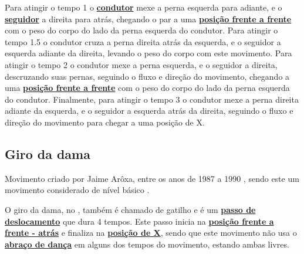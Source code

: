 Para atingir o tempo 1 o \hyperref[def:Condutor]{\textbf{condutor}} mexe a perna esquerda para adiante, 
e o \hyperref[def:Seguidor]{\textbf{seguidor}}  a direita para atrás,
chegando o par a uma \hyperref[def:frente-frente-position]{\textbf{posição frente a frente}}
com o peso do corpo do lado da perna esquerda do condutor.
Para atingir o tempo 1.5 o condutor cruza a perna direita atrás da esquerda,
e o seguidor a esquerda adiante da direita, levando o peso do corpo com este movimento.
Para atingir o tempo 2 o condutor mexe a perna esquerda, e o seguidor a direita,
descruzando suas pernas, seguindo o fluxo e direção do movimento,
chegando a uma \hyperref[def:frente-frente-position]{\textbf{posição frente a frente}}
com o peso do corpo do lado da perna esquerda do condutor.
Finalmente, para atingir o tempo 3 o condutor mexe a perna direita adiante da esquerda,
e o seguidor a esquerda atrás da direita, 
seguindo o fluxo e direção do movimento para chegar a uma posição de X. 

\subsection{Giro da dama}
Movimento criado por Jaime Arôxa, entre os anos de 1987 a 1990 \cite{EntrevistaJaimeAroxa1},
sendo este um movimento considerado de nível básico \cite[pp. 144]{perna2002samba}.

O giro da dama, no \AnoLivro, também é chamado de gatilho e 
é um \hyperref[def:PassoDeDeslocamento]{\textbf{passo de deslocamento}} que dura 4 tempos.
Este passo inicia na \hyperref[def:ffa-position]{\textbf{posição frente a frente - atrás}} e 
finaliza na \hyperref[def:X-position]{\textbf{posição de X}},
sendo que este movimento não usa o \hyperref[def:abracodedanca]{\textbf{abraço de dança}} 
em alguns dos tempos do movimento,
estando  ambas livres.

